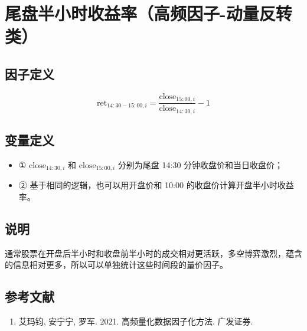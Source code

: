 \documentclass{article}
\begin{document}
\section{尾盘半小时收益率（高频因子-动量反转类）}

\subsection{因子定义}
\begin{equation}
    \mathrm{ret}_{14:30-15:00,i} = \frac{\mathrm{close}_{15:00,i}}{\mathrm{close}_{14:30,i}} - 1
\end{equation}

\subsection{变量定义}
\begin{itemize}
    \item ① \( \mathrm{close}_{14:30,i} \) 和 \( \mathrm{close}_{15:00,i} \) 分别为尾盘 14:30 分钟收盘价和当日收盘价；
    \item ② 基于相同的逻辑，也可以用开盘价和 10:00 的收盘价计算开盘半小时收益率。
\end{itemize}

\subsection{说明}
通常股票在开盘后半小时和收盘前半小时的成交相对更活跃，多空博弈激烈，蕴含的信息相对更多，所以可以单独统计这些时间段的量价因子。

\subsection{参考文献}
\begin{enumerate}
    \item 艾玛钧, 安宁宁, 罗军. 2021. 高频量化数据因子化方法. 广发证券.
\end{enumerate}
\end{document}
